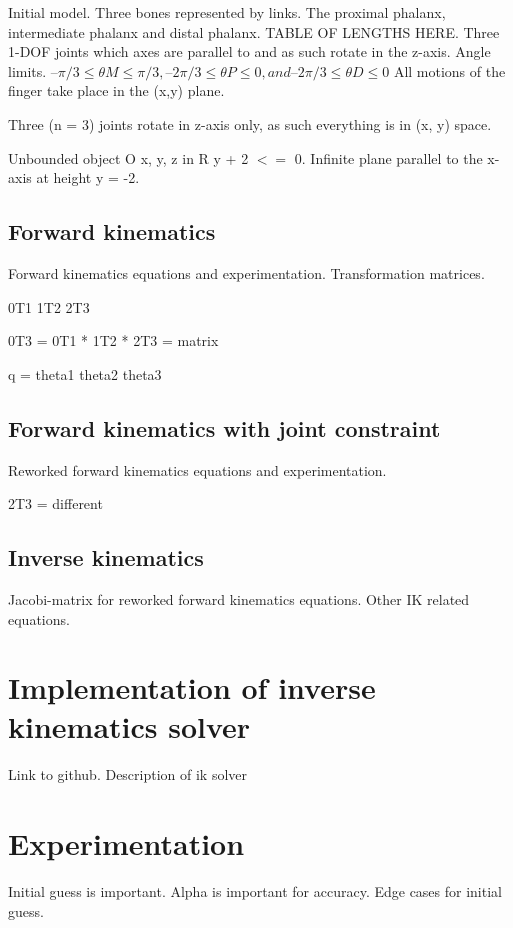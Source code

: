 \documentclass{article}
\begin{document}
Initial model. Three bones represented by links. The proximal phalanx, intermediate phalanx and distal phalanx. TABLE OF LENGTHS HERE.
Three 1-DOF joints which axes are parallel to and as such rotate in the z-axis. Angle limits.
$ – \pi / 3 ≤ \theta M ≤ \pi / 3, –2 \pi / 3 ≤ \theta P ≤ 0, and –2 \pi / 3 ≤ \theta D ≤ 0$
All motions of the finger take place in the (x,y) plane.

Three (n = 3) joints rotate in z-axis only, as such everything is in (x, y) space.

Unbounded object O x, y, z in R y + 2 $<=$ 0. Infinite plane parallel to the x-axis at height y = -2.

\subsection{Forward kinematics}

Forward kinematics equations and experimentation. Transformation matrices.

0T1
1T2
2T3

0T3 = 0T1 * 1T2 * 2T3 = matrix

q = theta1 theta2 theta3


\subsection{Forward kinematics with joint constraint}

Reworked forward kinematics equations and experimentation.

2T3 = different

\subsection{Inverse kinematics}

Jacobi-matrix for reworked forward kinematics equations. Other IK related equations.

\section{Implementation of inverse kinematics solver}

Link to github. Description of ik solver

\section{Experimentation}

Initial guess is important. Alpha is important for accuracy. Edge cases for initial guess.  
\end{document}
